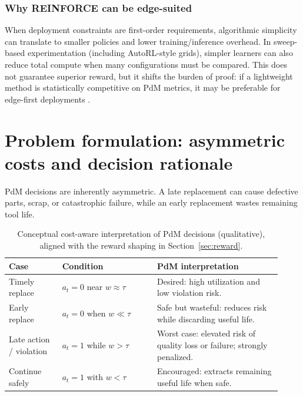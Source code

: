 \documentclass[sn-basic]{sn-jnl} %
\begin{document}
\subsubsection{Why REINFORCE can be edge-suited}
When deployment constraints are first-order requirements, algorithmic simplicity can translate to smaller policies and lower training/inference overhead. In sweep-based experimentation (including AutoRL-style grids), simpler learners can also reduce total compute when many configurations must be compared. This does not guarantee superior reward, but it shifts the burden of proof: if a lightweight method is statistically competitive on PdM metrics, it may be preferable for edge-first deployments \cite{Schwartz2020, Njor2024}.

\section{Problem formulation: asymmetric costs and decision rationale}
\label{sec:problem}
PdM decisions are inherently asymmetric. A late replacement can cause defective parts, scrap, or catastrophic failure, while an early replacement wastes remaining tool life.

\begin{table}[t]
        \centering
        \caption{Conceptual cost-aware interpretation of PdM decisions (qualitative), aligned with the reward shaping in Section~\ref{sec:reward}.}
        \label{tab:cost_view}
        \begin{tabular}{p{0.18\linewidth} p{0.32\linewidth} p{0.42\linewidth}}
                \toprule
                \textbf{Case} & \textbf{Condition} & \textbf{PdM interpretation}\\
                \midrule
                Timely replace & $a_t=0$ near $w\approx\tau$ & Desired: high utilization and low violation risk.\\
                Early replace & $a_t=0$ when $w\ll\tau$ & Safe but wasteful: reduces risk while discarding useful life.\\
                Late action / violation & $a_t=1$ while $w>\tau$ & Worst case: elevated risk of quality loss or failure; strongly penalized.\\
                Continue safely & $a_t=1$ with $w<\tau$ & Encouraged: extracts remaining useful life when safe.\\
                \bottomrule
        \end{tabular}
\end{table}
\end{document}
